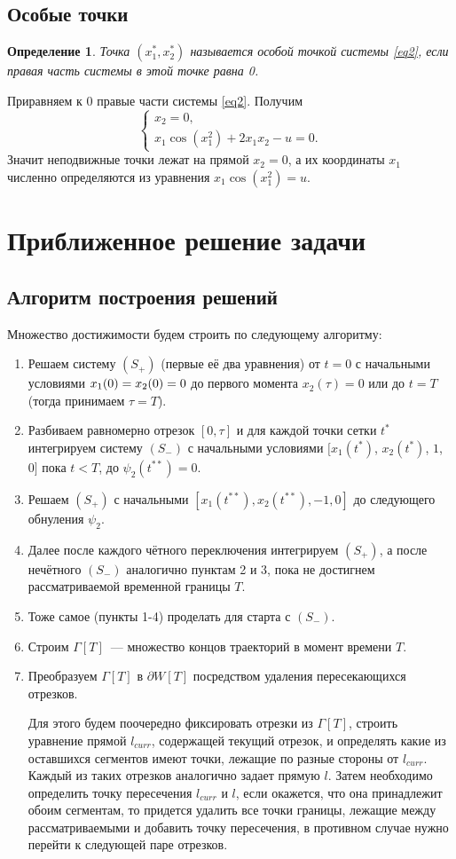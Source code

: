 \documentclass[a4paper,12pt]{article}
\newtheorem{definition}{Определение}
\newcommand{\hm}[1]{#1\nobreak\discretionary{}{\hbox{\ensuremath{#1}}}{}}
\begin{document}
\subsection{Особые точки}
\begin{definition}
	Точка $(x_1^*, x_2^*)$ называется особой точкой системы \eqref{eq2}, если правая часть системы в этой точке равна 0.
\end{definition}
Приравняем к 0 правые части системы \eqref{eq2}. Получим
$$\begin{cases}
	x_2 = 0, \\
	x_1\cos\left(x_1^2\right) + 2x_1x_2 -u = 0.
\end{cases}$$
Значит неподвижные точки лежат на прямой $x_2 = 0$, а их координаты $x_1$ численно определяются из уравнения $x_1\cos\left(x_1^2\right) = u$.

\section{Приближенное решение задачи}
\subsection{Алгоритм построения решений}
Множество достижимости будем строить по следующему алгоритму:
\begin{enumerate}
	\item Решаем систему $(S_{+})$ (первые её два уравнения) от $t = 0$ с начальными условиями $x_1(0) \hm = x_2(0) = 0$ до первого момента $x_2(\tau) = 0$ или до $t = T$ (тогда принимаем $\tau = T$).
	\item Разбиваем равномерно отрезок $[0, \tau]$ и для каждой точки сетки $t^*$ интегрируем систему $(S_{-})$ с начальными условиями $[x_1(t^*)$, $x_2(t^*)$, $1$, $0]$ пока $t < T$, до $\psi_2(t^{**}) = 0$.
	\item Решаем $(S_{+})$ с начальными $[x_1(t^{**}), x_2(t^{**}), -1, 0]$ до следующего обнуления $\psi_2$.
	\item Далее после каждого чётного переключения интегрируем $(S_{+})$, а после нечётного $(S_{-})$ аналогично пунктам 2 и 3, пока не достигнем рассматриваемой временной границы $T$.
	 \item Тоже самое (пункты 1-4) проделать для старта с $(S_{-})$.
	 \item Строим $\Gamma[T]$~--- множество концов траекторий в момент времени $T$.
	 \item Преобразуем $\Gamma[T]$ в $\partial W[T]$ посредством удаления пересекающихся отрезков. 
	 
	 Для этого будем поочередно фиксировать отрезки из $\Gamma[T]$, строить уравнение прямой $l_{curr}$, содержащей текущий отрезок, и определять какие из оставшихся сегментов имеют точки, лежащие по разные стороны от $l_{curr}$. Каждый из таких отрезков аналогично задает прямую $l$. Затем необходимо определить точку пересечения $l_{curr}$ и $l$, если окажется, что она принадлежит обоим сегментам, то придется удалить все точки границы, лежащие между рассматриваемыми и добавить точку пересечения, в противном случае нужно перейти к следующей паре отрезков.
\end{enumerate}
\end{document}
